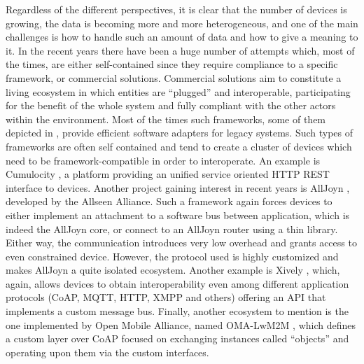 Regardless of the different perspectives, it is clear that the number of devices is growing, the data is becoming more and more heterogeneous, and one of the main challenges is how to handle such an amount of data and how to give a meaning to it.
In the recent years there have been a huge number of attempts which, most of the times, are either self-contained since they require compliance to a specific framework, or commercial solutions.
Commercial solutions aim to constitute a living ecosystem in which entities are ``plugged'' and interoperable, participating for the benefit of the whole system and fully compliant with the other actors within the environment.
Most of the times such frameworks, some of them depicted in \cite{derhamy2015survey}, provide efficient software adapters for legacy systems.
Such types of frameworks are often self contained and tend to create a cluster of devices which need to be framework-compatible in order to interoperate.
An example is Cumulocity \cite{cumulocity}, a platform providing an unified service oriented HTTP REST interface to devices.
Another project gaining interest in recent years is AllJoyn \cite{alljoyn}, developed by the Allseen Alliance.
Such a framework again forces devices to either implement an attachment to a software bus between application, which is indeed the AllJoyn core, or connect to an AllJoyn router using a thin library.
Either way, the communication introduces very low overhead and grants access to even constrained device.
However, the protocol used is highly customized and makes AllJoyn a quite isolated ecosystem.
Another example is Xively \cite{xively}, which, again, allows devices to obtain interoperability even among different application protocols (CoAP, MQTT, HTTP, XMPP and others) offering an API that implements a custom message bus.
Finally, another ecosystem to mention is the one implemented by Open Mobile Alliance, named OMA-LwM2M \cite{omalwm2m}, which defines a custom layer over CoAP focused on exchanging instances called ``objects'' and operating upon them via the custom interfaces.